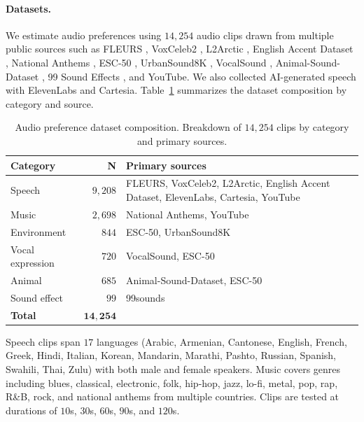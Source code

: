 \paragraph{Datasets.}
We estimate audio preferences using $14{,}254$ audio clips drawn from multiple public sources such as FLEURS \citep{conneau2023fleurs}, VoxCeleb2 \citep{dt_voxceleb2}, L2Arctic \citep{zhao2018l2arctic}, English Accent Dataset \citep{westbrook2023englishaccent}, National Anthems \citep{kendall_nationalanthems}, ESC-50 \citep{piczak2015esc}, UrbanSound8K \citep{salamon2014urbansound}, VocalSound \citep{gong2022vocalsound}, Animal-Sound-Dataset \citep{sasmaz2018_animalsounds}, 99 Sound Effects \citep{zlatic2015_99sounds}, and YouTube. We also collected AI-generated speech with ElevenLabs and Cartesia.
Table~\ref{tab:audio-sources} summarizes the dataset composition by category and source.

\begin{table}[h]
\centering
\small
\caption{Audio preference dataset composition. Breakdown of $14{,}254$ clips by category and primary sources.}
\label{tab:audio-sources}
\begin{tabularx}{\textwidth}{@{}lrX@{}}
\toprule
\textbf{Category} & \textbf{N} & \textbf{Primary sources} \\
\midrule
Speech        & $9{,}208$ & FLEURS, VoxCeleb2, L2Arctic, English Accent Dataset, ElevenLabs, Cartesia, YouTube \\
Music         & $2{,}698$ & National Anthems, YouTube \\
Environment   & $844$     & ESC-50, UrbanSound8K \\
Vocal expression  & $720$      & VocalSound, ESC-50 \\
Animal        & $685$      & Animal-Sound-Dataset, ESC-50 \\
Sound effect  & $99$       & 99sounds \\
\midrule
\textbf{Total} & $\mathbf{14{,}254}$ & \\
\bottomrule
\end{tabularx}
\end{table}

Speech clips span $17$ languages (Arabic, Armenian, Cantonese, English, French, Greek, Hindi, Italian, Korean, Mandarin, Marathi, Pashto, Russian, Spanish, Swahili, Thai, Zulu) with both male and female speakers. Music covers genres including blues, classical, electronic, folk, hip-hop, jazz, lo-fi, metal, pop, rap, R\&B, rock, and national anthems from multiple countries. Clips are tested at durations of $10$s, $30$s, $60$s, $90$s, and $120$s.

